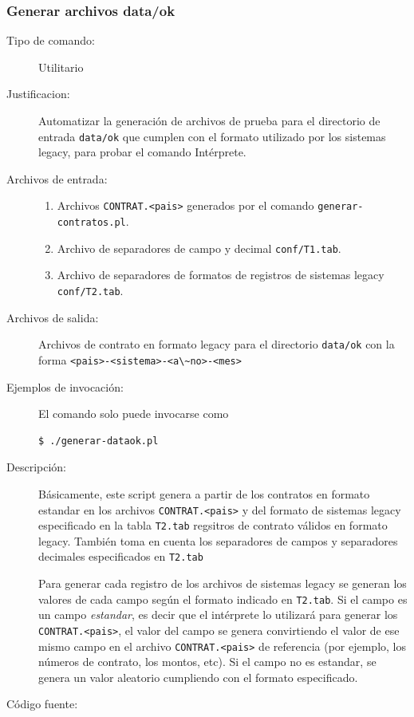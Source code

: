 \documentclass[12pt]{article}
\begin{document}
\subsubsection{Generar archivos data/ok}
\begin{description}
	\item [Tipo de comando:] Utilitario
	
	\item [Justificacion: ] Automatizar la generaci\'on de archivos de prueba para el directorio de entrada \verb|data/ok| que cumplen con el formato utilizado por los sistemas legacy, para probar el comando Int\'erprete.
	\item [Archivos de entrada:] 
		\begin{enumerate}
			\item Archivos \verb|CONTRAT.<pais>| generados por el comando \verb|generar-contratos.pl|.
			\item Archivo de separadores de campo y decimal \verb|conf/T1.tab|.
			\item Archivo de separadores de formatos de registros de sistemas legacy \verb|conf/T2.tab|.
		\end{enumerate}

	\item [Archivos de salida:] Archivos de contrato en formato legacy para el directorio \verb|data/ok| con la forma \verb|<pais>-<sistema>-<a\~no>-<mes>|
	\item [Ejemplos de invocación:]	El comando solo puede invocarse como 
	\begin{verbatim}$ ./generar-dataok.pl\end{verbatim}

	\item [Descripci\'on: ]
		B\'asicamente, este script genera a partir de los contratos en formato estandar en los archivos \verb|CONTRAT.<pais>| y del formato de sistemas legacy especificado en la tabla \verb|T2.tab| regsitros de contrato v\'alidos en formato legacy. Tambi\'en toma en cuenta los separadores de campos y separadores decimales especificados en \verb|T2.tab|

		Para generar cada registro de los archivos de sistemas legacy se generan los valores de cada campo seg\'un el formato indicado en \verb|T2.tab|. Si el campo es un campo \textit{estandar}, es decir que el int\'erprete lo utilizar\'a para generar los \verb|CONTRAT.<pais>|, el valor del campo se genera convirtiendo el valor de ese mismo campo en el archivo \verb|CONTRAT.<pais>| de referencia (por ejemplo, los n\'umeros de contrato, los montos, etc). Si el campo no es estandar, se genera un valor aleatorio cumpliendo con el formato especificado.

	\item [Código fuente:]

\end{description}
{\footnotesize

}
\end{document}
